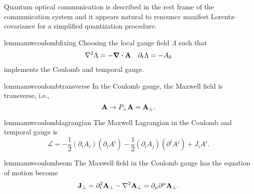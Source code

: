 Quantum optical communication is described in the rest frame of the communication system and it appears natural to renounce manifest Lorentz-covariance for a simplified quantization procedure.
\begin{restatable}{lemma}{mwcoulombfixing}
	Choosing the local gauge field $\Lambda$ such that
	\begin{align}
		\laplacian
		\Lambda
		=
		-
		\div\vb{A}
		&&
		\partial_t
		\Lambda
		=
		-
		A_0
	\end{align}
	implements the Coulomb and temporal gauge.
\end{restatable}
\begin{restatable}{lemma}{mwcoulombtransverse}
	In the Coulomb gauge, the Maxwell field is transverse, i.e.,
	\begin{equation}
		\vb{A}
		\to
		P_\perp
		\vb{A}
		=
		\vb{A}_\perp
		.
	\end{equation}
\end{restatable}
\begin{restatable}{lemma}{mwcoulomblagrangian}\label{thm:mw_coulomb_lagrangian}
	The Maxwell Lagrangian in the Coulomb and temporal gauge is
	\begin{equation}
		\mathcal{L}
		=
		-
		\frac{1}{2}
		\left(\partial_t A_i\right)
		\left(\partial_t A^i\right)
		-
		\frac{1}{2}
		\left(\partial_i A_j\right)
		\left(\partial^i A^j\right)
		+
		J_i A^i
		\label{eq:mw_coulomb_lagrangian}
		.
	\end{equation}
\end{restatable}
\begin{restatable}{lemma}{mwcoulombeom}\label{thm:mw_coulomb_eom}
	The Maxwell field in the Coulomb gauge has the equation of motion become
	\begin{equation}
		\vb{J}_\perp
		=
		\partial_t^2\vb{A}_\perp
		-
		\laplacian\vb{A}_\perp
		=
		\partial_\mu \partial^\mu
		\vb{A}_\perp
		\label{eq:mw_coulomb_eom}
		.
	\end{equation}
\end{restatable}
